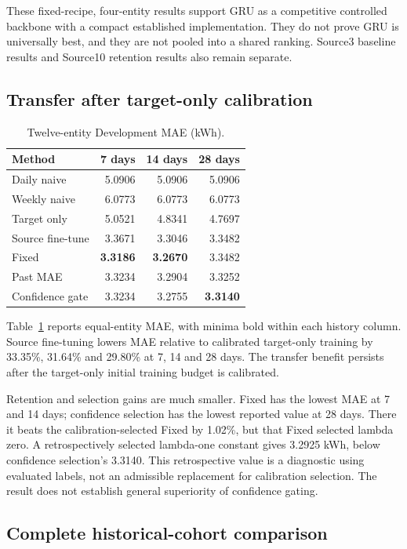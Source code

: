 \documentclass[pdflatex,iicol,sn-mathphys-num]{sn-jnl}
\begin{document}
These fixed-recipe, four-entity results support GRU as a competitive controlled backbone with a compact established implementation. They do not prove GRU is universally best, and they are not pooled into a shared ranking. Source3 baseline results and Source10 retention results also remain separate.

\subsection{Transfer after target-only calibration}
\begin{table}[t]
\centering\small
\caption{Twelve-entity Development MAE (kWh).}\label{tab:history}
\begin{tabularx}{\columnwidth}{@{}>{\raggedright\arraybackslash}Xrrr@{}}\toprule
Method & 7 days & 14 days & 28 days\\\midrule
Daily naive & 5.0906 & 5.0906 & 5.0906\\
Weekly naive & 6.0773 & 6.0773 & 6.0773\\
Target only & 5.0521 & 4.8341 & 4.7697\\
Source fine-tune & 3.3671 & 3.3046 & 3.3482\\
Fixed & \textbf{3.3186} & \textbf{3.2670} & 3.3482\\
Past MAE & 3.3234 & 3.2904 & 3.3252\\
Confidence gate & 3.3234 & 3.2755 & \textbf{3.3140}\\
\bottomrule\end{tabularx}
\end{table}

Table~\ref{tab:history} reports equal-entity MAE, with minima bold within each history column. Source fine-tuning lowers MAE relative to calibrated target-only training by 33.35\%, 31.64\% and 29.80\% at 7, 14 and 28 days. The transfer benefit persists after the target-only initial training budget is calibrated.

Retention and selection gains are much smaller. Fixed has the lowest MAE at 7 and 14 days; confidence selection has the lowest reported value at 28 days. There it beats the calibration-selected Fixed by 1.02\%, but that Fixed selected lambda zero. A retrospectively selected lambda-one constant gives 3.2925 kWh, below confidence selection's 3.3140. This retrospective value is a diagnostic using evaluated labels, not an admissible replacement for calibration selection. The result does not establish general superiority of confidence gating.

\subsection{Complete historical-cohort comparison}
\end{document}
